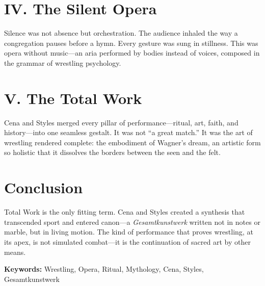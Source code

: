 \documentclass[12pt]{article}
\begin{document}
\section*{IV. The Silent Opera}
Silence was not absence but orchestration. The audience inhaled the way a congregation pauses before a hymn. Every gesture was sung in stillness. This was opera without music—an aria performed by bodies instead of voices, composed in the grammar of wrestling psychology.

\section*{V. The Total Work}
Cena and Styles merged every pillar of performance—ritual, art, faith, and history—into one seamless gestalt. It was not “a great match.” It was the art of wrestling rendered complete: the embodiment of Wagner’s dream, an artistic form so holistic that it dissolves the borders between the seen and the felt.

\section*{Conclusion}
Total Work is the only fitting term. Cena and Styles created a synthesis that transcended sport and entered canon—a \textit{Gesamtkunstwerk} written not in notes or marble, but in living motion. The kind of performance that proves wrestling, at its apex, is not simulated combat—it is the continuation of sacred art by other means.

\vspace{1em}
\noindent\textbf{Keywords:} Wrestling, Opera, Ritual, Mythology, Cena, Styles, Gesamtkunstwerk
\end{document}
